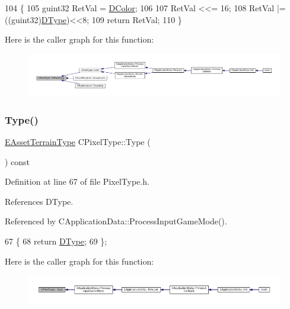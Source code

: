 \begin{DoxyCode}
104                                       \{
105     guint32 RetVal = \hyperlink{classCPixelType_a474243cf748aee94cfa207659e940b6c}{DColor};
106     
107     RetVal <<= 16;
108     RetVal |= ((guint32)\hyperlink{classCPixelType_aca37f042b510a349e0d3209c73ae51c5}{DType})<<8;
109     \textcolor{keywordflow}{return} RetVal;
110 \}
\end{DoxyCode}
Here is the caller graph for this function\+:\nopagebreak
\begin{figure}[H]
\begin{center}
\leavevmode
\includegraphics[width=350pt]{classCPixelType_abdad3e51c47f410745f7795931798cb3_icgraph}
\end{center}
\end{figure}
\hypertarget{classCPixelType_ac2d23be310266e7679b248435f05f2d3}{}\label{classCPixelType_ac2d23be310266e7679b248435f05f2d3} 
\subsubsection{\texorpdfstring{Type()}{Type()}}
{\footnotesize\ttfamily \hyperlink{classCPixelType_af06457fd1c2ff34c67ce670e633a10b0}{E\+Asset\+Terrain\+Type} C\+Pixel\+Type\+::\+Type (\begin{DoxyParamCaption}{ }\end{DoxyParamCaption}) const\hspace{0.3cm}{\ttfamily [inline]}}



Definition at line 67 of file Pixel\+Type.\+h.



References D\+Type.



Referenced by C\+Application\+Data\+::\+Process\+Input\+Game\+Mode().


\begin{DoxyCode}
67                                       \{
68             \textcolor{keywordflow}{return} \hyperlink{classCPixelType_aca37f042b510a349e0d3209c73ae51c5}{DType};  
69         \};
\end{DoxyCode}
Here is the caller graph for this function\+:\nopagebreak
\begin{figure}[H]
\begin{center}
\leavevmode
\includegraphics[width=350pt]{classCPixelType_ac2d23be310266e7679b248435f05f2d3_icgraph}
\end{center}
\end{figure}


